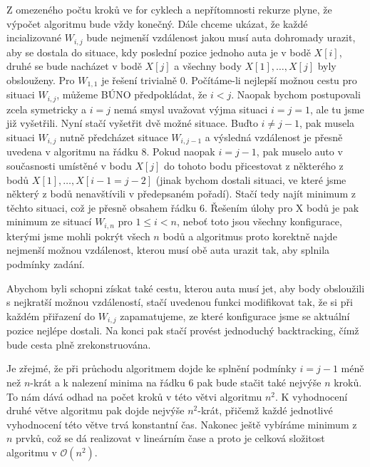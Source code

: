 \documentclass[12pt,a4paper]{article}
\theoremstyle{plain}
\begin{document}
Z omezeného počtu kroků ve for cyklech a nepřítomnosti rekurze plyne, že výpočet algoritmu bude vždy konečný. Dále chceme ukázat, že každé incializované $ W_{i,j} $ bude nejmenší vzdálenost jakou musí auta dohromady urazit, aby se dostala do situace, kdy poslední pozice jednoho auta je v bodě $ X[i] $, druhé se bude nacházet v bodě $ X[j] $ a všechny body $X[1],\dots,X[j] $ byly obslouženy. Pro $ W_{1,1} $ je řešení trivialně 0. Počítáme-li nejlepší možnou cestu pro situaci $ W_{i,j} $, můžeme BÚNO předpokládat, že $ i < j $. Naopak bychom postupovali zcela symetricky a $ i = j $ nemá smysl uvažovat výjma situaci $ i = j = 1 $, ale tu jsme již vyšetřili. Nyní stačí vyšetřit dvě možné situace. Buďto $ i \neq j - 1$, pak musela situaci $ W_{i,j} $ nutně předcházet situace $ W_{i,j - 1} $ a výsledná vzdálenost je přesně uvedena v algoritmu na řádku 8.  Pokud naopak $ i = j - 1$, pak muselo auto v současnosti umístěné v bodu $ X[j] $ do tohoto bodu přicestovat z některého z bodů $ X[1],\dots,X[i - 1 = j -2] $ (jinak bychom dostali situaci, ve které jsme některý z bodů nenavštívili v předepsaném pořadí). Stačí tedy najít minimum z těchto situaci, což je přesně obsahem řádku 6. Řešením úlohy pro X bodů je pak minimum ze situací $ W_{i, n} $ pro $ 1 \leq i < n $, neboť toto jsou všechny konfigurace, kterými jsme mohli pokrýt všech $ n $ bodů a algoritmus proto korektně najde nejmenší možnou vzdálenost, kterou musí obě auta urazit tak, aby splnila podmínky zadání. 

Abychom byli schopni získat také cestu, kterou auta musí jet, aby body obsloužili s nejkratší možnou vzdáleností, stačí uvedenou funkci modifikovat tak, že si při každém přiřazení do $ W_{i,j} $ zapamatujeme, ze které konfigurace jsme se aktuální pozice nejlépe dostali. Na konci pak stačí provést jednoduchý backtracking, čímž bude cesta plně zrekonstruována.

Je zřejmé, že při průchodu algoritmem dojde ke splnění podmínky $ i = j - 1 $ méně než $ n $-krát a k nalezení minima na řádku 6 pak bude stačit také nejvýše $ n $ kroků. To nám dává odhad na počet kroků v této větvi algoritmu $ n^2$. K vyhodnocení druhé větve algoritmu pak dojde nejvýše $ n^2 $-krát, přičemž každé jednotlivé vyhodnocení této větve trvá konstantní čas. Nakonec ještě vybíráme minimum z $ n $ prvků, což se dá realizovat v lineárním čase a proto je celková složitost algoritmu v $\mathcal{O}(n^2) $.
\end{document}
